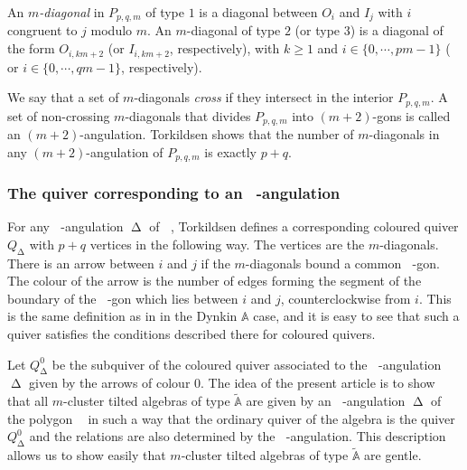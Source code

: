 \documentclass{amsart}
\theoremstyle{plain}
\theoremstyle{definition}
\begin{document}
An \emph{$m$-diagonal} in $P_{p,q,m}$  of type $1$ is  a diagonal  between $O_i$ and $I_j$ with $i$  congruent to $j$ modulo $m$. An $m$-diagonal  of type $2$  (or type $3$) is a diagonal of the form $O_{i,km+2}$ (or $I_{i,km+2}$, respectively), with $k \geq 1$ and  $i\in \{0,\cdots, pm-1\}$ ( or $i\in \{0,\cdots, qm-1\}$, respectively).

We say that a set of $m$-diagonals \emph{cross} if they intersect in the interior $P_{p,q,m}$. A set of non-crossing $m$-diagonals that divides $P_{p,q,m}$ into $(m+2)$-gons is called an $(m+2)$-angulation. Torkildsen \cite[Prop. 4.2]{T12-arxiv} shows that the number of $m$-diagonals in any  $(m+2)$-angulation of $P_{p,q,m}$ is exactly $p+q$.

\subsubsection{The  quiver corresponding to an ${\mathop{(m+2)}\nolimits}$-angulation}

For any ${\mathop{(m+2)}\nolimits}$-angulation ${\mathop{\Delta}\nolimits}$ of ${\mathop{P_{p,q,m}}\nolimits}$, Torkildsen \cite{T12-arxiv} defines a corresponding coloured quiver $Q_{\mathop{\Delta}\nolimits}$ with $p+q$ vertices in the following way. The vertices are the $m$-diagonals. There
is an arrow between $i$ and $j$ if the $m$-diagonals bound a common ${\mathop{(m+2)}\nolimits}$-gon. The
colour of the arrow is the number of edges forming the segment of the boundary of
the ${\mathop{(m+2)}\nolimits}$-gon which lies between $i$ and $j$, counterclockwise from $i$. This is the
same definition as in \cite{Buan2009} in the Dynkin $\mathbb{A}$ case, and it is easy to see that such a
quiver satisfies the conditions described there for coloured quivers.

Let $Q_{\mathop{\Delta}\nolimits}^0$ be  the  subquiver of the coloured quiver  associated to the ${\mathop{(m+2)}\nolimits}$-angulation ${\mathop{\Delta}\nolimits}$ given by the arrows of colour $0$. The idea of the present  article is to show that all   $m$-cluster tilted algebras of  type $\tilde{\mathbb{A}}$ are given by an ${\mathop{(m+2)}\nolimits}$-angulation ${\mathop{\Delta}\nolimits}$ of the  polygon ${\mathop{P_{p,q,m}}\nolimits}$ in such a way that the ordinary quiver of the algebra is the quiver   $Q_{\mathop{\Delta}\nolimits}^0$ and the relations are also determined by the  ${\mathop{(m+2)}\nolimits}$-angulation.  This description allows us to show easily that  $m$-cluster tilted algebras of type $\tilde{\mathbb{A}}$ are gentle.\\
\end{document}
